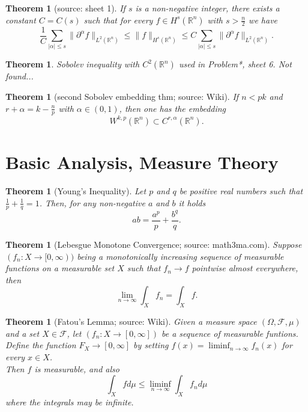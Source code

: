 \documentclass[12pt,a4paper]{article}
\newtheorem{thm}[definition]{Theorem}
\newcommand{\Rn}{\mathbb{R}^n}
\begin{document}
\begin{thm}[source: sheet 1]
If $s$ is a non-negative integer, there exists a constant $C=C(s)$ such that for every $f\in H^s(\mathbb{R}^n)$ with $s>\frac{n}{2}$ we have
\begin{equation}
\frac{1}{C} \sum_{\lvert\alpha\rvert\leq s} \lVert \partial ^{\alpha} f \rVert_{L^2(\mathbb{R}^n)} \leq \lVert f \rVert _{H^s(\mathbb{R}^n)} \leq C \sum_{\lvert\alpha\rvert\leq s} \lVert \partial ^{\alpha} f \rVert_{L^2(\mathbb{R}^n)}.
\end{equation}
\end{thm}

\begin{thm}
Sobolev inequality with $C^2(\Rn)$ used in Problem*, sheet 6. Not found...
\end{thm}

\begin{thm}[second Sobolev embedding thm; source: Wiki]
If $n<pk$ and $r+\alpha=k-\frac{n}{p}$ with $\alpha \in (0,1)$, then one has the embedding
\begin{equation}
W^{k,p}(\mathbb{R}^n) \subset C^{r,\alpha}(\mathbb{R}^n).
\end{equation}
\end{thm}


\section{Basic Analysis, Measure Theory}

\begin{thm}[Young's Inequality]
Let $p$ and $q$ be positive real numbers such that $\frac{1}{p} + \frac{1}{q} = 1$. Then, for any non-negative $a$ and $b$ it holds
\begin{equation}
ab=\frac{a^p}{p}+\frac{b^q}{q}.
\end{equation}
\end{thm}

\begin{thm}[Lebesgue Monotone Convergence; source: math3ma.com]
Suppose $(f_n:X\rightarrow [0,\infty))$ being a monotonically increasing sequence of measurable functions on a measurable set $X$ such that $f_n\rightarrow f$ pointwise almost everywhere, then
\begin{equation}
\lim_{n\rightarrow\infty} \int_X f_n = \int_X f.
\end{equation}
\end{thm}

\begin{thm}[Fatou's Lemma; source: Wiki]
Given a measure space $(\Omega, \mathcal{F}, \mu)$ and a set $X\in \mathcal{F}$, let $(f_n:X\rightarrow [0,\infty])$ be  a sequence of measurable funtions. Define the function $F_X\rightarrow[0,\infty]$ by setting $f(x)=\liminf_{n\rightarrow\infty} f_n(x)$ for every $x\in X$.\\
Then $f$ is measurable, and also
\begin{equation}
\int_X f d\mu \leq \liminf_{n\rightarrow \infty}\int_X f_n d\mu
\end{equation} 
where the integrals may be infinite.
\end{thm}
\end{document}
